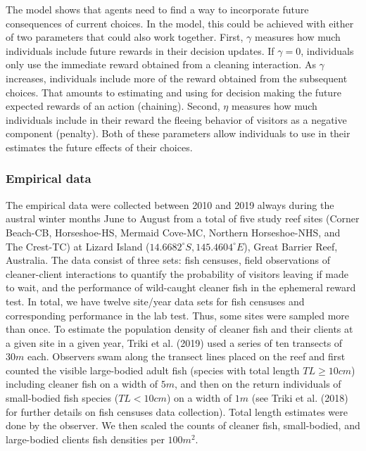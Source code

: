 \documentclass[
  12pt,
]{article}
\begin{document}
The model shows that agents need to find a way to incorporate future
consequences of current choices. In the model, this could be achieved
with either of two parameters that could also work together. First,
\(\gamma\) measures how much individuals include future rewards in their
decision updates. If \(\gamma=0\), individuals only use the immediate
reward obtained from a cleaning interaction. As \(\gamma\) increases,
individuals include more of the reward obtained from the subsequent
choices. That amounts to estimating and using for decision making the
future expected rewards of an action (chaining). Second, \(\eta\)
measures how much individuals include in their reward the fleeing
behavior of visitors as a negative component (penalty). Both of these
parameters allow individuals to use in their estimates the future
effects of their choices.

\hypertarget{empirical-data}{%
\subsubsection{Empirical data}\label{empirical-data}}

The empirical data were collected between 2010 and 2019 always during
the austral winter months June to August from a total of five study reef
sites (Corner Beach-CB, Horseshoe-HS, Mermaid Cove-MC, Northern
Horseshoe-NHS, and The Crest-TC) at Lizard Island
(\(14.6682^\circ S, 145.4604^\circ E\)), Great Barrier Reef, Australia.
The data consist of three sets: fish censuses, field observations of
cleaner-client interactions to quantify the probability of visitors
leaving if made to wait, and the performance of wild-caught cleaner fish
in the ephemeral reward test. In total, we have twelve site/year data
sets for fish censuses and corresponding performance in the lab test.
Thus, some sites were sampled more than once. To estimate the population
density of cleaner fish and their clients at a given site in a given
year, Triki et al. (2019) used a series of ten transects of \(30m\)
each. Observers swam along the transect lines placed on the reef and
first counted the visible large-bodied adult fish (species with total
length \(TL \geq 10cm\)) including cleaner fish on a width of \(5m\),
and then on the return individuals of small-bodied fish species
(\(TL < 10 cm\)) on a width of \(1 m\) (see Triki et al. (2018) for
further details on fish censuses data collection). Total length
estimates were done by the observer. We then scaled the counts of
cleaner fish, small-bodied, and large-bodied clients fish densities per
\(100 m^2\).
\end{document}

